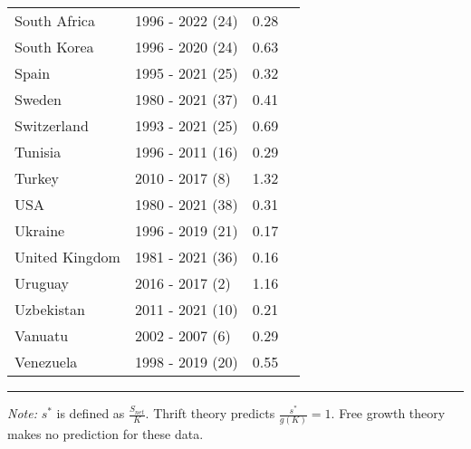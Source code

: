 \begin{table}[pos=h]
{{\begin{tabular}{llrr}
South Africa & 1996 - 2022 (24) & 0.28\\
South Korea & 1996 - 2020 (24) & 0.63\\
Spain & 1995 - 2021 (25) & 0.32\\
\addlinespace
Sweden & 1980 - 2021 (37) & 0.41\\
Switzerland & 1993 - 2021 (25) & 0.69\\
Tunisia & 1996 - 2011 (16) & 0.29\\
Turkey & 2010 - 2017 (8) & 1.32\\
USA & 1980 - 2021 (38) & 0.31\\
\addlinespace
Ukraine & 1996 - 2019 (21) & 0.17\\
United Kingdom & 1981 - 2021 (36) & 0.16\\
Uruguay & 2016 - 2017 (2) & 1.16\\
Uzbekistan & 2011 - 2021 (10) & 0.21\\
Vanuatu & 2002 - 2007 (6) & 0.29\\
\addlinespace
Venezuela & 1998 - 2019 (20) & 0.55\\ \end{tabular}

}
}
\hrule
\begin{flushleft}
\footnotesize \emph{Note:} \(s^*\) is defined as \(\frac{S_{net}}{K}\). Thrift theory predicts \(\frac{s^*}{g(K)} = 1\). Free growth theory makes no prediction for these data.
\end{flushleft}
\end{table}